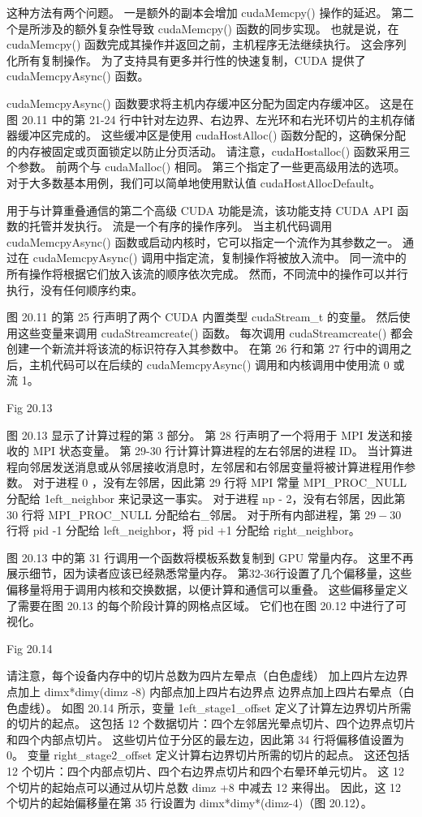 这种方法有两个问题。 一是额外的副本会增加 cudaMemcpy() 操作的延迟。 
第二个是所涉及的额外复杂性导致 cudaMemcpy() 函数的同步实现。 
也就是说，在 cudaMemcpy() 函数完成其操作并返回之前，主机程序无法继续执行。 
这会序列化所有复制操作。 为了支持具有更多并行性的快速复制，CUDA 提供了 cudaMemcpyAsync() 函数。

cudaMemcpyAsync() 函数要求将主机内存缓冲区分配为固定内存缓冲区。 
这是在图 20.11 中的第 21-24 行中针对左边界、右边界、左光环和右光环切片的主机存储器缓冲区完成的。 
这些缓冲区是使用 cudaHostAlloc() 函数分配的，这确保分配的内存被固定或页面锁定以防止分页活动。 
请注意，cudaHostalloc() 函数采用三个参数。 前两个与 cudaMalloc() 相同。 
第三个指定了一些更高级用法的选项。 对于大多数基本用例，我们可以简单地使用默认值 cudaHostAllocDefault。

用于与计算重叠通信的第二个高级 CUDA 功能是流，该功能支持 CUDA API 函数的托管并发执行。 流是一个有序的操作序列。 
当主机代码调用 cudaMemcpyAsync() 函数或启动内核时，它可以指定一个流作为其参数之一。 
通过在 cudaMemcpyAsync() 调用中指定流，复制操作将被放入流中。 同一流中的所有操作将根据它们放入该流的顺序依次完成。 
然而，不同流中的操作可以并行执行，没有任何顺序约束。

图 20.11 的第 25 行声明了两个 CUDA 内置类型 cudaStream\_t 的变量。 
然后使用这些变量来调用 cudaStreamcreate() 函数。 
每次调用 cudaStreamcreate() 都会创建一个新流并将该流的标识符存入其参数中。 
在第 26 行和第 27 行中的调用之后，主机代码可以在后续的 cudaMemcpyAsync() 调用和内核调用中使用流 0 或流 1。

{\color{red} Fig 20.13}

图 20.13 显示了计算过程的第 3 部分。 第 28 行声明了一个将用于 MPI 发送和接收的 MPI 状态变量。 
第 29-30 行计算计算进程的左右邻居的进程 ID。 
当计算进程向邻居发送消息或从邻居接收消息时，左邻居和右邻居变量将被计算进程用作参数。 
对于进程 0 ，没有左邻居，因此第 29 行将 MPI 常量 MPI\_PROC\_NULL 分配给 1eft\_neighbor 来记录这一事实。 
对于进程 np - 2，没有右邻居，因此第 30 行将 MPI\_PROC\_NULL 分配给右\_邻居。 
对于所有内部进程，第 $29-30$ 行将 pid -1 分配给 left\_neighbor，将 pid +1 分配给 right\_neighbor。

图 20.13 中的第 31 行调用一个函数将模板系数复制到 GPU 常量内存。 这里不再展示细节，因为读者应该已经熟悉常量内存。 
第32-36行设置了几个偏移量，这些偏移量将用于调用内核和交换数据，以便计算和通信可以重叠。 
这些偏移量定义了需要在图 20.13 的每个阶段计算的网格点区域。 它们也在图 20.12 中进行了可视化。

{\color{red} Fig 20.14}

请注意，每个设备内存中的切片总数为四片左晕点（白色虚线）
加上四片左边界点加上 dimx*dimy(dimz -8) 内部点加上四片右边界点 边界点加上四片右晕点（白色虚线）。 
如图 20.14 所示，变量 1eft\_stage1\_offset 定义了计算左边界切片所需的切片的起点。 
这包括 12 个数据切片：四个左邻居光晕点切片、四个边界点切片和四个内部点切片。 
这些切片位于分区的最左边，因此第 34 行将偏移值设置为 0。 
变量 right\_stage2\_offset 定义计算右边界切片所需的切片的起点。 
这还包括 12 个切片：四个内部点切片、四个右边界点切片和四个右晕环单元切片。 
这 12 个切片的起始点可以通过从切片总数 dimz +8 中减去 12 来得出。 
因此，这 12 个切片的起始偏移量在第 35 行设置为 dimx*dimy*(dimz-4)（图 20.12）。

